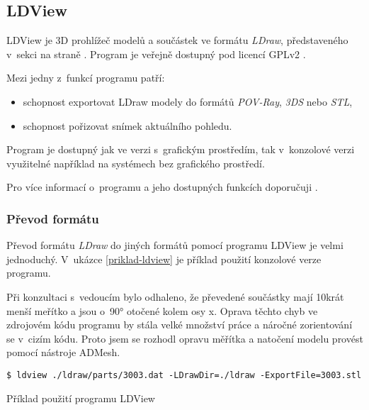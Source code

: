 \subsection{LDView}
LDView je 3D prohlížeč modelů a součástek ve formátu \textit{LDraw}, představeného v~sekci  na straně \pageref{ldraw-format}. Program je veřejně dostupný pod licencí \gls{GPLv2} \autocite{GPLv2}.

Mezi jedny z~funkcí programu patří: 
\begin{itemize}
    \item schopnost exportovat LDraw modely do formátů \textit{POV-Ray}, \textit{3DS} nebo \textit{STL},
    \item schopnost pořizovat snímek aktuálního pohledu.
\end{itemize}

Program je dostupný jak ve verzi s~grafickým prostředím, tak v~konzolové verzi využitelné například na systémech bez grafického prostředí.

Pro více informací o~programu a jeho dostupných funkcích doporučuji \autocite{ldview}.

\subsubsection*{Převod formátu}

Převod formátu \textit{LDraw} do jiných formátů pomocí programu LDView je velmi jednoduchý. V~ukázce \ref{priklad-ldview} je příklad použití konzolové verze programu. 

Při konzultaci s~vedoucím bylo odhaleno, že převedené součástky mají 10krát menší meřítko a jsou o~90° otočené kolem osy x. Oprava těchto chyb ve zdrojovém kódu programu by stála velké množství práce a náročné zorientování se v~cizím kódu. Proto jsem se rozhodl opravu měřítka a natočení modelu provést pomocí nástroje ADMesh. 

 \begin{listing}[htbp]
        \begin{verbatim}
$ ldview ./ldraw/parts/3003.dat -LDrawDir=./ldraw -ExportFile=3003.stl 
        \end{verbatim}
    \caption{Příklad použití programu LDView \label{priklad-ldview}}
\end{listing}





